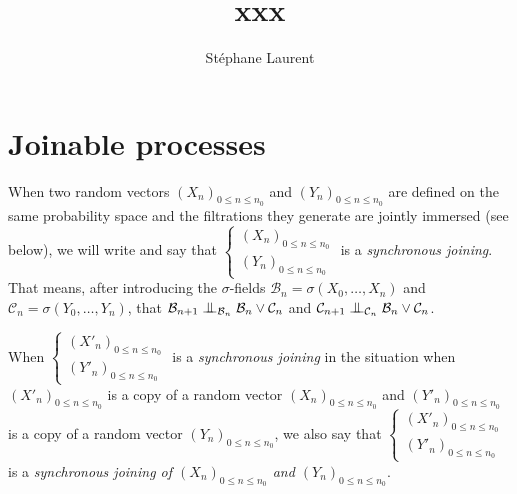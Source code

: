 \documentclass[12pt,a4paper]{article}
\author{Stéphane Laurent}
\title{xxx}
\begin{document}
\theoremstyle{defstyle}
\newtheorem{definition}{Definition}
\newtheorem{remark}{Remark}
\newtheorem{question}{Question}
\newtheorem{clarify}{To clarify}
\theoremstyle{thmstyle}
\newtheorem{thm}{Theorem}[section]
\newtheorem{ppsition}{Proposition}
\newtheorem{lemma}{Lemma}

\newcommand{\BB}{\mathcal{B}}
\newcommand{\CC}{\mathcal{C}}
\newcommand{\FF}{\mathcal{F}}
\newcommand{\GG}{\mathcal{G}}
\newcommand{\EE}{\mathbb{E}}
\newcommand{\HH}{\mathcal{H}}
\newcommand{\II}{\mathcal{I}}
\newcommand{\LL}{\mathcal{L}}
\newcommand{\OO}{\mathcal{O}}
\newcommand{\XX}{\mathcal{X}}
\newcommand{\given}{\mid}
\newcommand{\eps}{\epsilon}
\newcommand{\indic}{\boldsymbol 1}
\newcommand{\Vb}{\boldsymbol V}
\newcommand{\tildV}{\widetilde{V}}
\newcommand{\tildX}{\widetilde{X}}

\newcommand{\indvee}{\dot{\vee}}
\newcommand{\indep}{\mathrel{\text{\scalebox{1.07}{$\perp\mkern-10mu\perp$}}}}


\maketitle

\section{Joinable processes}

When two random vectors 
${(X_n)}_{0 \leq n \leq n_0}$ and ${(Y_n)}_{0 \leq n \leq n_0}$ are defined 
on the same probability space and the filtrations they generate are 
jointly immersed (see below), we will write and say that 
$\left\{\begin{smallmatrix} {(X_n)}_{0 \leq n \leq n_0} \\ 
{(Y_n)}_{0 \leq n \leq n_0}
\end{smallmatrix}\right.$  is a \emph{synchronous joining}. 
That means, after introducing the $\sigma$-fields 
$\BB_n = \sigma(X_{0}, \ldots, X_n)$ and  
$\CC_n = \sigma(Y_{0}, \ldots, Y_n)$, that 
$\BB_{n+1} \indep_{\BB_n} \BB_n \vee \CC_n$ 
and $\CC_{n+1} \indep_{\CC_n} \BB_n \vee \CC_n$.  

When $\left\{\begin{smallmatrix} {(X'_n)}_{0 \leq n \leq n_0} \\ 
{(Y'_n)}_{0 \leq n \leq n_0}
\end{smallmatrix}\right.$  is a \emph{synchronous joining} in the situation when 
${(X'_n)}_{0 \leq n \leq n_0}$ is a copy of a random vector 
${(X_n)}_{0 \leq n \leq n_0}$  and ${(Y'_n)}_{0 \leq n \leq n_0}$ 
is a copy of a random vector ${(Y_n)}_{0 \leq n \leq n_0}$, we also say that 
$\left\{\begin{smallmatrix} {(X'_n)}_{0 \leq n \leq n_0} \\ 
{(Y'_n)}_{0 \leq n \leq n_0}
\end{smallmatrix}\right.$  is a \emph{synchronous joining of 
${(X_n)}_{0 \leq n \leq n_0}$ and ${(Y_n)}_{0 \leq n \leq n_0}$}. 
\end{document}
